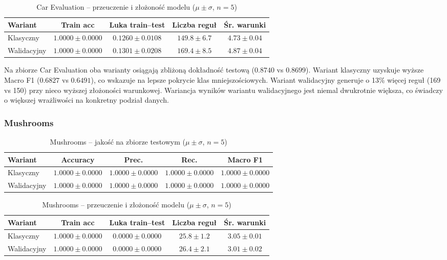 \documentclass[12pt,a4paper]{article}
\begin{document}
\begin{table}[H]
\centering
\caption{Car Evaluation -- przeuczenie i złożoność modelu ($\mu \pm \sigma$, $n=5$)}
\begin{tabular}{lcccc}
\toprule
Wariant & Train acc & Luka train--test & Liczba reguł & Śr. warunki \\
\midrule
Klasyczny   & $1.0000 \pm 0.0000$ & $0.1260 \pm 0.0108$ & $149.8 \pm 6.7$ & $4.73 \pm 0.04$ \\
Walidacyjny & $1.0000 \pm 0.0000$ & $0.1301 \pm 0.0208$ & $169.4 \pm 8.5$ & $4.87 \pm 0.04$ \\
\bottomrule
\end{tabular}
\end{table}

Na zbiorze Car Evaluation oba warianty osiągają zbliżoną dokładność testową
($0.8740$ vs $0.8699$). Wariant klasyczny uzyskuje wyższe Macro F1
($0.6827$ vs $0.6491$), co wskazuje na lepsze pokrycie klas mniejszościowych.
Wariant walidacyjny generuje o 13\% więcej reguł (169 vs 150) przy nieco wyższej
złożoności warunkowej. Wariancja wyników wariantu walidacyjnego jest niemal
dwukrotnie większa, co świadczy o większej wrażliwości na konkretny podział danych.

\subsubsection*{Mushrooms}

\begin{table}[H]
\centering
\caption{Mushrooms -- jakość na zbiorze testowym ($\mu \pm \sigma$, $n=5$)}
\begin{tabular}{lcccc}
\toprule
Wariant & Accuracy & Prec. & Rec. & Macro F1 \\
\midrule
Klasyczny   & $1.0000 \pm 0.0000$ & $1.0000 \pm 0.0000$ & $1.0000 \pm 0.0000$ & $1.0000 \pm 0.0000$ \\
Walidacyjny & $1.0000 \pm 0.0000$ & $1.0000 \pm 0.0000$ & $1.0000 \pm 0.0000$ & $1.0000 \pm 0.0000$ \\
\bottomrule
\end{tabular}
\end{table}

\begin{table}[H]
\centering
\caption{Mushrooms -- przeuczenie i złożoność modelu ($\mu \pm \sigma$, $n=5$)}
\begin{tabular}{lcccc}
\toprule
Wariant & Train acc & Luka train--test & Liczba reguł & Śr. warunki \\
\midrule
Klasyczny   & $1.0000 \pm 0.0000$ & $0.0000 \pm 0.0000$ & $25.8 \pm 1.2$ & $3.05 \pm 0.01$ \\
Walidacyjny & $1.0000 \pm 0.0000$ & $0.0000 \pm 0.0000$ & $26.4 \pm 2.1$ & $3.01 \pm 0.02$ \\
\bottomrule
\end{tabular}
\end{table}
\end{document}
